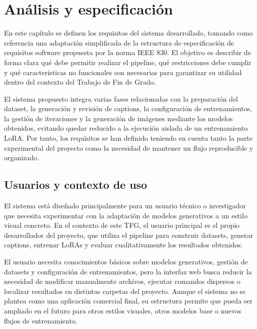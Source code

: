 \documentclass[a4paper,11pt,titlepage]{scrbook}
\begin{document}
\chapter{Análisis y especificación} \label{analisis_especificacion}

En este capítulo se definen los requisitos del sistema desarrollado, tomando como referencia una adaptación simplificada de la estructura de especificación de requisitos software propuesta por la norma IEEE 830. El objetivo es describir de forma clara qué debe permitir realizar el pipeline, qué restricciones debe cumplir y qué características no funcionales son necesarias para garantizar su utilidad dentro del contexto del Trabajo de Fin de Grado.

\medskip

El sistema propuesto integra varias fases relacionadas con la preparación del dataset, la generación y revisión de captions, la configuración de entrenamientos, la gestión de iteraciones y la generación de imágenes mediante los modelos obtenidos, evitando quedar reducido a la ejecución aislada de un entrenamiento LoRA. Por tanto, los requisitos se han definido teniendo en cuenta tanto la parte experimental del proyecto como la necesidad de mantener un flujo reproducible y organizado.


\section{Usuarios y contexto de uso}

El sistema está diseñado principalmente para un usuario técnico o investigador que necesita experimentar con la adaptación de modelos generativos a un estilo visual concreto. En el contexto de este TFG, el usuario principal es el propio desarrollador del proyecto, que utiliza el pipeline para construir datasets, generar captions, entrenar LoRAs y evaluar cualitativamente los resultados obtenidos.

\medskip

El usuario necesita conocimientos básicos sobre modelos generativos, gestión de datasets y configuración de entrenamientos, pero la interfaz web busca reducir la necesidad de modificar manualmente archivos, ejecutar comandos dispersos o localizar resultados en distintas carpetas del proyecto. Aunque el sistema no se plantea como una aplicación comercial final, su estructura permite que pueda ser ampliado en el futuro para otros estilos visuales, otros modelos base o nuevos flujos de entrenamiento.
\end{document}
